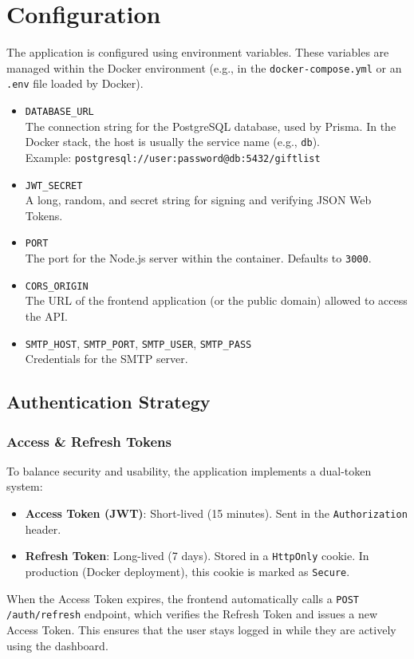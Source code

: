 \section{Configuration}
The application is configured using environment variables. These variables are managed within the Docker environment (e.g., in the \texttt{docker-compose.yml} or an \texttt{.env} file loaded by Docker).

\begin{itemize}
    \item \texttt{DATABASE\_URL} \\
        The connection string for the PostgreSQL database, used by Prisma. In the Docker stack, the host is usually the service name (e.g., \texttt{db}). \\
        Example: \texttt{postgresql://user:password@db:5432/giftlist}
    \item \texttt{JWT\_SECRET} \\
        A long, random, and secret string for signing and verifying JSON Web Tokens.
    \item \texttt{PORT} \\
        The port for the Node.js server within the container. Defaults to \texttt{3000}.
    \item \texttt{CORS\_ORIGIN} \\
        The URL of the frontend application (or the public domain) allowed to access the API.
    \item \texttt{SMTP\_HOST}, \texttt{SMTP\_PORT}, \texttt{SMTP\_USER}, \texttt{SMTP\_PASS} \\
        Credentials for the SMTP server.
\end{itemize}

\subsection{Authentication Strategy}
\subsubsection{Access \& Refresh Tokens}
To balance security and usability, the application implements a dual-token system:
\begin{itemize}
    \item \textbf{Access Token (JWT)}: Short-lived (15 minutes). Sent in the \texttt{Authorization} header.
    \item \textbf{Refresh Token}: Long-lived (7 days). Stored in a \texttt{HttpOnly} cookie. In production (Docker deployment), this cookie is marked as \texttt{Secure}.
\end{itemize}
When the Access Token expires, the frontend automatically calls a \texttt{POST /auth/refresh} endpoint, which verifies the Refresh Token and issues a new Access Token. This ensures that the user stays logged in while they are actively using the dashboard.

